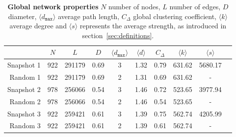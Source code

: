 \begin{table}[htbp]
\centering
\caption[Global network properties]{\textbf{Global network properties} $N$ number of nodes, $L$ number of edges, $D$ diameter, $\langle d_{\texttt{max}} \rangle$ average path length, $C_\Delta$ global clustering coefficient, $\langle k \rangle$ average degree and $\langle s \rangle$ represents the average strength, as introduced in section~\ref{sec:definitions}.}
\label{tab:stats}
\vspace*{5mm}
\begin{tabularx}{\textwidth}{rccccccccc}
\toprule
{} &  $N$ &   $L$ &  $D$ &  $\langle d_{\texttt{max}} \rangle$ &  $\langle d \rangle$ &   $C_\Delta$ & $\langle k \rangle$ &  $\langle s \rangle$ \\
\midrule
Snapshot 1 & 922 & 291179 & 0.69 & 3 & 1.32 &  0.79 & 631.62 & 5680.17 \\
Random 1  & 922 & 291179 & 0.69 & 2 & 1.31 &  0.69 & 631.62 & - \\ \midrule
Snapshot 2 & 978 & 256066 & 0.54 & 3 & 1.46 &  0.72 & 523.65 & 3977.94 \\
Random 2  & 978 & 256066 & 0.54 & 2 & 1.46 &  0.54 & 523.65 & - \\ \midrule
Snapshot 3 & 922 & 259421 & 0.61 & 3 & 1.39 &  0.75 & 562.74 & 4205.99 \\
Random 3  & 922 & 259421 & 0.61 & 2 & 1.39 &  0.61 & 562.74 & - \\
\bottomrule
\end{tabularx}
\end{table}
